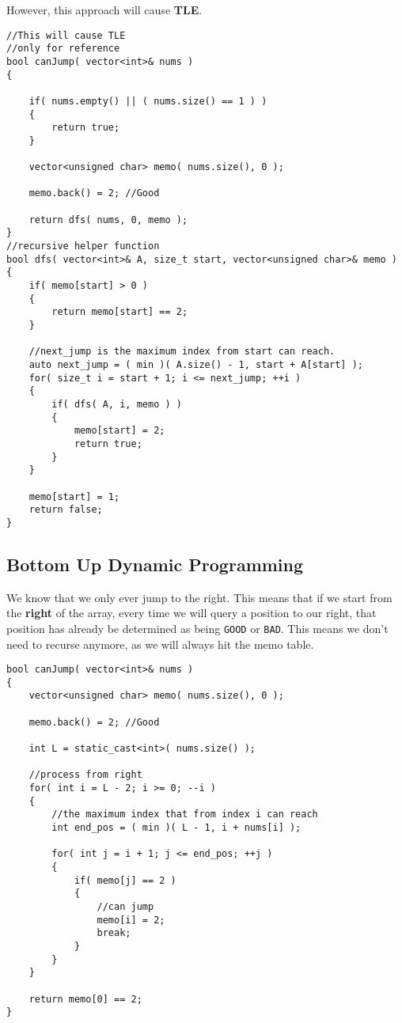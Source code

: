 However, this approach will cause \textbf{TLE}.

\begin{lstlisting}[style=customc, caption={Top Down Dynamic Programming}]
//This will cause TLE
//only for reference
bool canJump( vector<int>& nums )
{

    if( nums.empty() || ( nums.size() == 1 ) )
    {
        return true;
    }

    vector<unsigned char> memo( nums.size(), 0 );

    memo.back() = 2; //Good

    return dfs( nums, 0, memo );
}
//recursive helper function
bool dfs( vector<int>& A, size_t start, vector<unsigned char>& memo )
{
    if( memo[start] > 0 )
    {
        return memo[start] == 2;
    }

    //next_jump is the maximum index from start can reach.
    auto next_jump = ( min )( A.size() - 1, start + A[start] );
    for( size_t i = start + 1; i <= next_jump; ++i )
    {
        if( dfs( A, i, memo ) )
        {
            memo[start] = 2;
            return true;
        }
    }

    memo[start] = 1;
    return false;
}
\end{lstlisting}

\subsection{Bottom Up Dynamic Programming}
We know that we only ever jump to the right. This means that if we start from the \textbf{right} of the array, every time we will query a position to our right, that position has already be determined as being \texttt{GOOD} or \texttt{BAD}. This means we don't need to recurse anymore, as we will always hit the memo table.

\setcounter{lstlisting}{0}
\begin{lstlisting}[style=customc, caption={Bottom Up Dynamic Programming}]
bool canJump( vector<int>& nums )
{
    vector<unsigned char> memo( nums.size(), 0 );

    memo.back() = 2; //Good

    int L = static_cast<int>( nums.size() );

    //process from right
    for( int i = L - 2; i >= 0; --i )
    {
        //the maximum index that from index i can reach
        int end_pos = ( min )( L - 1, i + nums[i] );

        for( int j = i + 1; j <= end_pos; ++j )
        {
            if( memo[j] == 2 )
            {
                //can jump
                memo[i] = 2;
                break;
            }
        }
    }

    return memo[0] == 2;
}
\end{lstlisting}